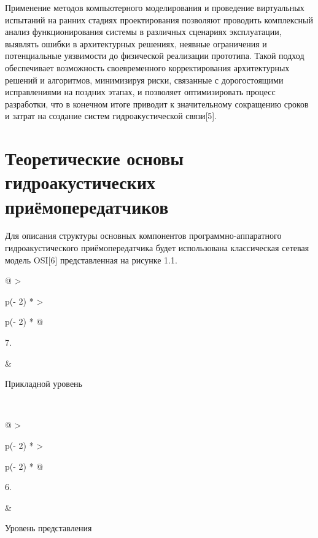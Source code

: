 Применение методов компьютерного моделирования и проведение виртуальных
испытаний на ранних стадиях проектирования позволяют проводить
комплексный анализ функционирования системы в различных сценариях
эксплуатации, выявлять ошибки в архитектурных решениях, неявные
ограничения и потенциальные уязвимости до физической реализации
прототипа. Такой подход обеспечивает возможность своевременного
корректирования архитектурных решений и алгоритмов, минимизируя риски,
связанные с дорогостоящими исправлениями на поздних этапах, и позволяет
оптимизировать процесс разработки, что в конечном итоге приводит к
значительному сокращению сроков и затрат на создание систем
гидроакустической связи{[}5{]}.

\section{Теоретические основы гидроакустических
приёмопередатчиков}\label{ux442ux435ux43eux440ux435ux442ux438ux447ux435ux441ux43aux438ux435-ux43eux441ux43dux43eux432ux44b-ux433ux438ux434ux440ux43eux430ux43aux443ux441ux442ux438ux447ux435ux441ux43aux438ux445-ux43fux440ux438ux451ux43cux43eux43fux435ux440ux435ux434ux430ux442ux447ux438ux43aux43eux432}

\label{_Toc167813676}{}Для описания структуры основных
компонентов программно-аппаратного гидроакустического приёмопередатчика
будет использована классическая сетевая модель OSI{[}6{]} представленная
на рисунке 1.1.

\begin{longtable}[]{@{}
  >{\raggedright\arraybackslash}p{(\columnwidth - 2\tabcolsep) * }
  >{\raggedright\arraybackslash}p{(\columnwidth - 2\tabcolsep) * }@{}}
\toprule\noalign{}
\begin{minipage}[b]{\linewidth}\raggedright
7.
\end{minipage} & \begin{minipage}[b]{\linewidth}\raggedright
Прикладной уровень
\end{minipage} \\
\midrule\noalign{}
\endhead
\bottomrule\noalign{}
\endlastfoot
\end{longtable}

\begin{longtable}[]{@{}
  >{\raggedright\arraybackslash}p{(\columnwidth - 2\tabcolsep) * }
  >{\raggedright\arraybackslash}p{(\columnwidth - 2\tabcolsep) * }@{}}
\toprule\noalign{}
\begin{minipage}[b]{\linewidth}\raggedright
6.
\end{minipage} & \begin{minipage}[b]{\linewidth}\raggedright
Уровень представления
\end{minipage} \\
\midrule\noalign{}
\endhead
\bottomrule\noalign{}
\endlastfoot
\end{longtable}


